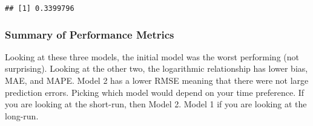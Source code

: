 \documentclass[
]{article}
\begin{document}
\begin{verbatim}
## [1] 0.3399796
\end{verbatim}

\subsubsection{Summary of Performance
Metrics}\label{summary-of-performance-metrics}

Looking at these three models, the initial model was the worst
performing (not surprising). Looking at the other two, the logarithmic
relationship has lower bias, MAE, and MAPE. Model 2 has a lower RMSE
meaning that there were not large prediction errors. Picking which model
would depend on your time preference. If you are looking at the
short-run, then Model 2. Model 1 if you are looking at the long-run.
\end{document}
